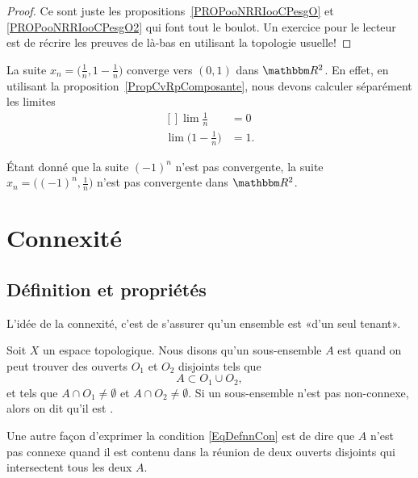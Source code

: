 \begin{proof}
  Ce sont juste les propositions~\ref{PROPooNRRIooCPesgO} et \ref{PROPooNRRIooCPesgO2} qui font tout le boulot. Un exercice pour le lecteur est de récrire les preuves de là-bas en utilisant la topologie usuelle!
\end{proof}


\begin{example}
	La suite $x_n=\big( \frac{1}{ n },1-\frac{1}{ n } \big)$ converge vers $(0,1)$ dans $\eR^2$. En effet, en utilisant la proposition~\ref{PropCvRpComposante}, nous devons calculer séparément les limites
	\begin{equation}
		\begin{aligned}[]
			\lim\frac{1}{ n }&=0\\
			\lim\big( 1-\frac{1}{ n } \big)&=1.
		\end{aligned}
	\end{equation}
\end{example}

\begin{example}
	Étant donné que la suite $(-1)^n$ n'est pas convergente, la suite $x_n=\big( (-1)^n,\frac{1}{ n } \big)$ n'est pas convergente dans $\eR^2$.
\end{example}

\section{Connexité}

\subsection{Définition et propriétés}

L'idée de la connexité, c'est de s'assurer qu'un ensemble est «d'un seul tenant».

\begin{definition}  \label{DefIRKNooJJlmiD}
     Soit \( X \) un espace topologique. Nous disons qu'un sous-ensemble \(A\) est  quand on peut trouver des ouverts \(O_1\) et \(O_2\) disjoints tels que
    \begin{equation}    \label{EqDefnnCon}
        A\subset O_1 \cup O_2,
    \end{equation}
    et tels que \(A\cap O_1\neq\emptyset\) et \(A\cap O_2\neq\emptyset\). Si un sous-ensemble n'est pas non-connexe, alors on dit qu'il est .
\end{definition}
Une autre façon d'exprimer la condition \eqref{EqDefnnCon} est de dire que $A$ n'est pas connexe quand il est contenu dans la réunion de deux ouverts disjoints qui intersectent tous les deux $A$.

